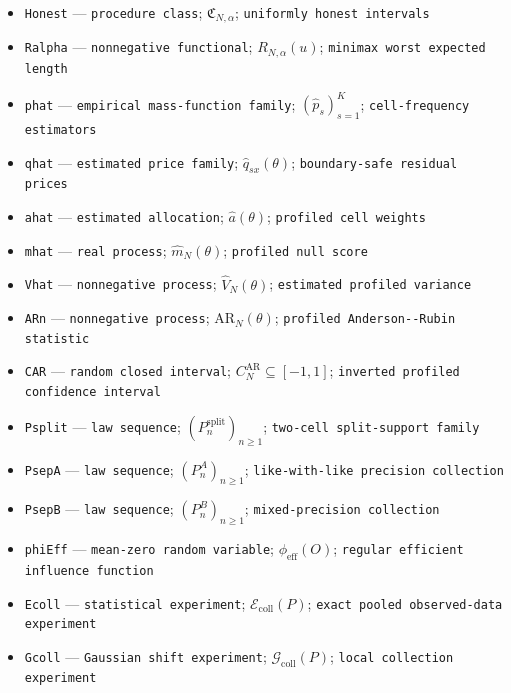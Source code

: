 \documentclass{article}
\begin{document}
\begin{itemize}
  \item \texttt{Honest} --- \texttt{procedure class}; \(\mathfrak C_{N,\alpha}\); \texttt{uniformly honest intervals}
  \item \texttt{Ralpha} --- \texttt{nonnegative functional}; \(R_{N,\alpha}(u)\); \texttt{minimax worst expected length}
  \item \texttt{phat} --- \texttt{empirical mass-\allowbreak{}function family}; \((\widehat p_s)_{s=1}^K\); \texttt{cell-\allowbreak{}frequency estimators}
  \item \texttt{qhat} --- \texttt{estimated price family}; \(\widehat q_{sx}(\theta)\); \texttt{boundary-\allowbreak{}safe residual prices}
  \item \texttt{ahat} --- \texttt{estimated allocation}; \(\widehat a(\theta)\); \texttt{profiled cell weights}
  \item \texttt{mhat} --- \texttt{real process}; \(\widehat m_N(\theta)\); \texttt{profiled null score}
  \item \texttt{Vhat} --- \texttt{nonnegative process}; \(\widehat V_N(\theta)\); \texttt{estimated profiled variance}
  \item \texttt{ARn} --- \texttt{nonnegative process}; \(\mathrm{AR}_N(\theta)\); \texttt{profiled Anderson-\allowbreak{}-\allowbreak{}Rubin statistic}
  \item \texttt{CAR} --- \texttt{random closed interval}; \(C_N^{\mathrm{AR}}\subseteq[-1,1]\); \texttt{inverted profiled confidence interval}
  \item \texttt{Psplit} --- \texttt{law sequence}; \((P_n^{\mathrm{split}})_{n\ge1}\); \texttt{two-\allowbreak{}cell split-\allowbreak{}support family}
  \item \texttt{PsepA} --- \texttt{law sequence}; \((P_n^A)_{n\ge1}\); \texttt{like-\allowbreak{}with-\allowbreak{}like precision collection}
  \item \texttt{PsepB} --- \texttt{law sequence}; \((P_n^B)_{n\ge1}\); \texttt{mixed-\allowbreak{}precision collection}
  \item \texttt{phiEff} --- \texttt{mean-\allowbreak{}zero random variable}; \(\phi_{\mathrm{eff}}(O)\); \texttt{regular efficient influence function}
  \item \texttt{Ecoll} --- \texttt{statistical experiment}; \(\mathcal E_{\mathrm{coll}}(P)\); \texttt{exact pooled observed-\allowbreak{}data experiment}
  \item \texttt{Gcoll} --- \texttt{Gaussian shift experiment}; \(\mathcal G_{\mathrm{coll}}(P)\); \texttt{local collection experiment}

\end{itemize}
\end{document}

